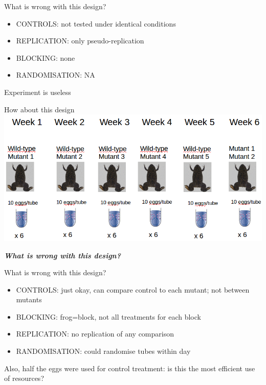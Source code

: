 \documentclass{beamer}
\begin{document}
\begin{frame}{What is wrong with this design?}
 \begin{alertblock}{}
 \begin{itemize}
  \item CONTROLS: not tested under identical conditions
  \item REPLICATION: only pseudo-replication
  \item BLOCKING: none
  \item RANDOMISATION: NA
 \end{itemize}
 \end{alertblock}
 
 \pause
 
 Experiment is useless

\end{frame}
\begin{frame}{How about this design}
 \includegraphics[width=\textwidth]{Figures/expdes3}
 \pause
 
 \emph{\textbf{What is wrong with this design?}}
\end{frame}


\begin{frame}{What is wrong with this design?}
 \begin{alertblock}{}
 \begin{itemize}
  \item CONTROLS: just okay, can compare control to each mutant; not between mutants
  \item BLOCKING: frog=block, not all treatments for each block
  \item REPLICATION: no replication of any comparison
  \item RANDOMISATION: could randomise tubes within day
 \end{itemize}
 Also, half the eggs were used for control treatment: is this the most efficient use of resources?
 \end{alertblock}
 
\end{frame}
\end{document}
